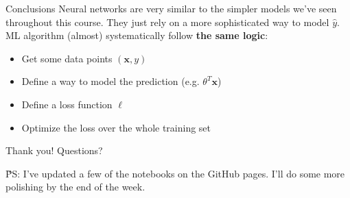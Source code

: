 \documentclass{beamer}
\newcommand{\1}[1]{\mathbbm{1}\left[#1\right]}
\newcommand{\yhat}{\hat{y}}
\newcommand{\bx}{\bm{x}}
\newcommand{\pv}{\pause\vfill}
\begin{document}
\begin{frame}{Conclusions}
Neural networks are very similar to the simpler models we've seen throughout this course. They just rely on a more sophisticated way to model $\yhat$.
\pv
ML algorithm (almost) systematically follow \textbf{the same logic}:
\begin{itemize}
	\item Get some data points $(\bx, y)$
	\item Define a way to model the prediction (e.g. $\theta^T \bx$)
	\item Define a loss function $\ell$
	\item Optimize the loss over the whole training set
\end{itemize}
\end{frame}

\begin{frame}
\begin{center}
\Huge{Thank you! Questions?}
\end{center}
\v
PS: I've updated a few of the notebooks on the GitHub pages. I'll do some more polishing by the end of the week.
\end{frame}
\end{document}
